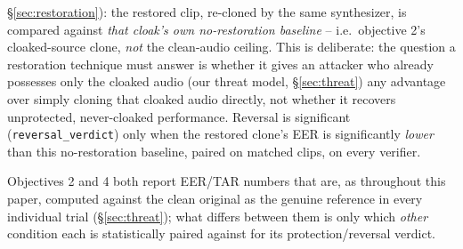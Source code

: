 \documentclass[11pt]{article}
\begin{document}
\begin{enumerate}
    \S\ref{sec:restoration}): the restored clip, re-cloned by the same
    synthesizer, is compared against \emph{that cloak's own
    no-restoration baseline} -- i.e.\ objective 2's cloaked-source
    clone, \emph{not} the clean-audio ceiling. This is deliberate: the
    question a restoration technique must answer is whether it gives
    an attacker who already possesses only the cloaked audio (our
    threat model, \S\ref{sec:threat}) any advantage over simply
    cloning that cloaked audio directly, not whether it recovers
    unprotected, never-cloaked performance. Reversal is significant
    (\texttt{reversal\_verdict}) only when the restored clone's EER is
    significantly \emph{lower} than this no-restoration baseline,
    paired on matched clips, on every verifier.
\end{enumerate}
Objectives 2 and 4 both report EER/TAR numbers that are, as
throughout this paper, computed against the clean original as the
genuine reference in every individual trial (\S\ref{sec:threat}); what
differs between them is only which \emph{other} condition each is
statistically paired against for its protection/reversal verdict.
\end{document}
